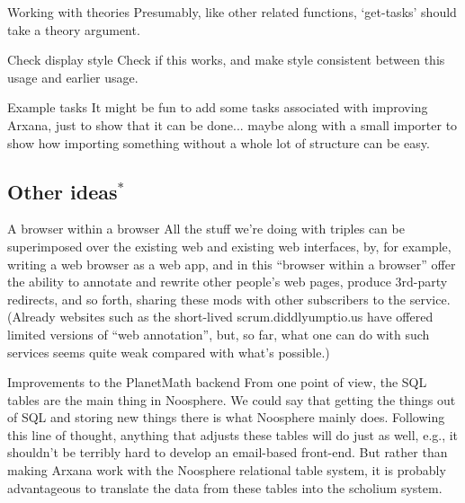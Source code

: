 \begin{notate}{Working with theories}
Presumably, like other related functions, `get-tasks'
should take a theory argument.
\end{notate}

\begin{notate}{Check display style}
Check if this works, and make style consistent between
this usage and earlier usage.
\end{notate}

\begin{notate}{Example tasks}
It might be fun to add some tasks associated with
improving Arxana, just to show that it can be done...
maybe along with a small importer to show how importing
something without a whole lot of structure can be easy.
\end{notate}

\subsection{Other ideas$^*$}

\begin{notate}{A browser within a browser} \label{browser-within}
All the stuff we're doing with triples can be superimposed
over the existing web and existing web interfaces, by, for
example, writing a web browser as a web app, and in this
``browser within a browser'' offer the ability to annotate
and rewrite other people's web pages, produce 3rd-party
redirects, and so forth, sharing these mods with other
subscribers to the service.  (Already websites such as the
short-lived scrum.diddlyumptio.us have offered limited
versions of ``web annotation'', but, so far, what one can
do with such services seems quite weak compared with
what's possible.)
\end{notate}

\begin{notate}{Improvements to the PlanetMath backend}
From one point of view, the SQL tables are the main thing
in Noosphere.  We could say that getting the things out of
SQL and storing new things there is what Noosphere mainly
does.  Following this line of thought, anything that
adjusts these tables will do just as well, e.g., it
shouldn't be terribly hard to develop an email-based
front-end.  But rather than making Arxana work with the
Noosphere relational table system, it is probably
advantageous to translate the data from these tables into
the scholium system.
\end{notate}

